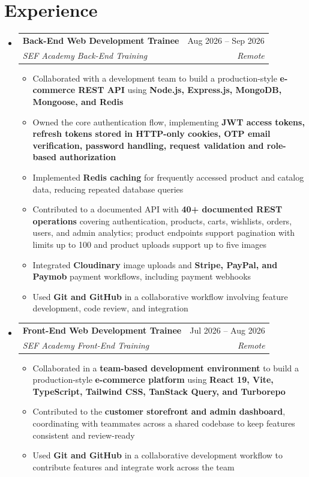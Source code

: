 \documentclass[letterpaper,11pt]{article}
\makeatletter
\newcommand{\resumeItem}[1]{
  \item\small{
    {#1 \vspace{-2pt}}
  }
}
\newcommand{\resumeSubheading}[4]{
  \vspace{-2pt}\item
  \begin{tabular*}{0.97\textwidth}[t]{l@{\extracolsep{\fill}}r}
    \textbf{#1} & #2 \\
    \textit{\small#3} & \textit{\small #4} \\
  \end{tabular*}\vspace{-7pt}
}
\newcommand{\resumeSubHeadingListStart}{\begin{itemize}[leftmargin=0.15in, label={}]}
\newcommand{\resumeSubHeadingListEnd}{\end{itemize}}
\newcommand{\resumeItemListStart}{\begin{itemize}}
\newcommand{\resumeItemListEnd}{\end{itemize}\vspace{-5pt}}
\makeatother
\begin{document}
\section{Experience}
  \resumeSubHeadingListStart
    \resumeSubheading
      {Back-End Web Development Trainee}{Aug 2026 -- Sep 2026}
      {SEF Academy Back-End Training}{Remote}
      \resumeItemListStart
        \resumeItem{Collaborated with a development team to build a production-style \textbf{e-commerce REST API} using \textbf{Node.js, Express.js, MongoDB, Mongoose, and Redis}}
        \resumeItem{Owned the core authentication flow, implementing \textbf{JWT access tokens, refresh tokens stored in HTTP-only cookies, OTP email verification, password handling, request validation and role-based authorization}}
        \resumeItem{Implemented \textbf{Redis caching} for frequently accessed product and catalog data, reducing repeated database queries}
        \resumeItem{Contributed to a documented API with \textbf{40+ documented REST operations} covering authentication, products, carts, wishlists, orders, users, and admin analytics; product endpoints support pagination with limits up to 100 and product uploads support up to five images}
        \resumeItem{Integrated \textbf{Cloudinary} image uploads and \textbf{Stripe, PayPal, and Paymob} payment workflows, including payment webhooks}
        \resumeItem{Used \textbf{Git and GitHub} in a collaborative workflow involving feature development, code review, and integration}
      \resumeItemListEnd
    \resumeSubheading
      {Front-End Web Development Trainee}{Jul 2026 -- Aug 2026}
      {SEF Academy Front-End Training}{Remote}
      \resumeItemListStart
        \resumeItem{Collaborated in a \textbf{team-based development environment} to build a production-style \textbf{e-commerce platform} using \textbf{React 19, Vite, TypeScript, Tailwind CSS, TanStack Query, and Turborepo}}
        \resumeItem{Contributed to the \textbf{customer storefront and admin dashboard}, coordinating with teammates across a shared codebase to keep features consistent and review-ready}
        \resumeItem{Used \textbf{Git and GitHub} in a collaborative development workflow to contribute features and integrate work across the team}
      \resumeItemListEnd
  \resumeSubHeadingListEnd

\end{document}
